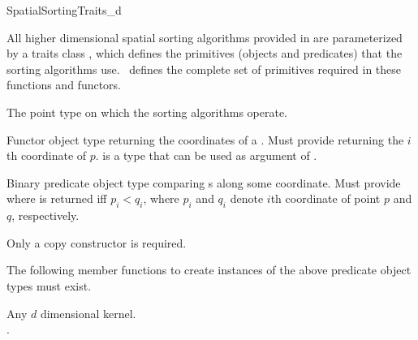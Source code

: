 

\begin{ccRefConcept}{SpatialSortingTraits_d}

\ccDefinition
  
All higher dimensional spatial sorting algorithms provided in \cgal{} are parameterized
by a traits class , which defines the
primitives (objects and predicates) that the sorting algorithms use.
\ccRefName\ defines the complete set of primitives required in these
functions and functors.

\ccTypes
\ccAutoIndexingOff
{}

%
       {The point type on which the sorting algorithms operate.
       }


%
       {Functor object type returning the coordinates of a  .
       Must provide 
          returning the $i$th
        coordinate of $p$.  is a type that can be used as
        argument of .
       }


%
       {Binary predicate object type comparing s
        along some coordinate.
        Must provide 
         where 
        is returned iff $p_i < q_i$,
        where $p_i$ and $q_i$ denote $i$th coordinate of point $p$ and $q$,
        respectively.
       }

\ccCreation
{}  %

Only a copy constructor is required.


\ccOperations

The following member functions to create instances of the above predicate
object types must exist. 

\setlength\parskip{0mm}

\ccParDims
\ccHasModels

Any \cgal{} $d$ dimensional kernel.\\
.

\ccParDims
\end{ccRefConcept}


